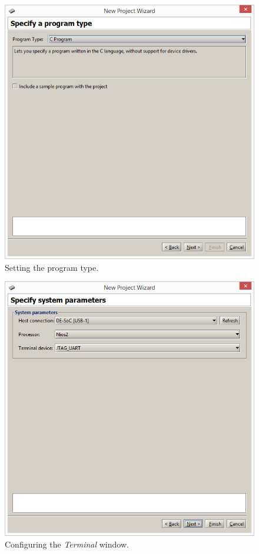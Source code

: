 \documentclass[epsfig,10pt,fullpage]{article}
\begin{document}
\begin{figure}[H]
	\begin{center}
	\includegraphics[scale=0.58]{figures/figureMP_progtype.png}
	\end{center}
	\vspace{-0.25cm}\caption{Setting the program type.}
\label{fig:MPprogtype}
\end{figure}
\begin{figure}[H]
	\begin{center}
	\includegraphics[scale=0.58]{figures/figureMP_terminal.png}
	\end{center}
	\vspace{-0.25cm}\caption{Configuring the {\it Terminal} window.}
\label{fig:MPterminal}
\end{figure}
\end{document}
